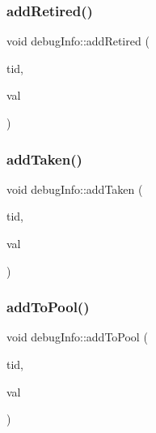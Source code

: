 \mbox{\label{classdebugInfo_a6cb34e0e4af05ab1e306bfb54bce1985}} 
\subsubsection{\texorpdfstring{add\+Retired()}{addRetired()}}
{\footnotesize\ttfamily void debug\+Info\+::add\+Retired (\begin{DoxyParamCaption}\item[{const int}]{tid,  }\item[{const int}]{val }\end{DoxyParamCaption})\hspace{0.3cm}{\ttfamily [inline]}}

\mbox{\label{classdebugInfo_a78df57a1e985926a359d16c52e450be5}} 
\subsubsection{\texorpdfstring{add\+Taken()}{addTaken()}}
{\footnotesize\ttfamily void debug\+Info\+::add\+Taken (\begin{DoxyParamCaption}\item[{const int}]{tid,  }\item[{const int}]{val }\end{DoxyParamCaption})\hspace{0.3cm}{\ttfamily [inline]}}

\mbox{\label{classdebugInfo_a3536c9bcae7dc8713f0f96c5f7249933}} 
\subsubsection{\texorpdfstring{add\+To\+Pool()}{addToPool()}}
{\footnotesize\ttfamily void debug\+Info\+::add\+To\+Pool (\begin{DoxyParamCaption}\item[{const int}]{tid,  }\item[{const int}]{val }\end{DoxyParamCaption})\hspace{0.3cm}{\ttfamily [inline]}}

